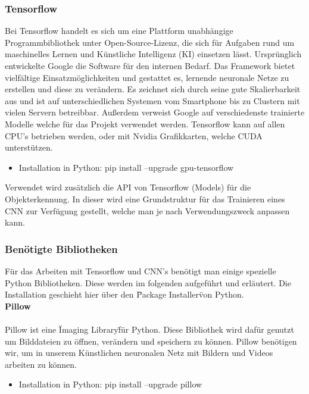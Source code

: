 \documentclass[a4paper,12pt,oneside]{article}
\begin{document}
  \subsubsection{Tensorflow}
Bei Tensorflow handelt es sich um eine Plattform unabhängige Programmbibliothek unter Open-Source-Lizenz, die sich für Aufgaben rund um maschinelles Lernen und Künstliche Intelligenz (KI) einsetzen lässt. Ursprünglich entwickelte Google die Software für den internen Bedarf. Das Framework bietet vielfältige Einsatzmöglichkeiten und gestattet es, lernende neuronale Netze zu erstellen und diese zu verändern. Es zeichnet sich durch seine gute Skalierbarkeit aus und ist auf unterschiedlichen Systemen vom Smartphone bis zu Clustern mit vielen Servern betreibbar. Außerdem verweist Google auf verschiedenste trainierte Modelle welche für das Projekt verwendet werden. Tensorflow kann auf allen CPU's betrieben werden, oder mit Nvidia Grafikkarten, welche CUDA unterstützen.

  \begin{itemize}
\item Installation in Python: pip install --upgrade gpu-tensorflow
  \end{itemize}
  
Verwendet wird zusätzlich die API von Tensorflow (Models) für die Objekterkennung. In dieser wird eine Grundstruktur für das Trainieren eines CNN zur Verfügung gestellt, welche man je nach Verwendungszweck anpassen kann.
  
  \subsubsection{Benötigte Bibliotheken}
Für das Arbeiten mit Tensorflow und CNN's benötigt man einige spezielle Python Bibliotheken. Diese werden im folgenden aufgeführt und erläutert. Die Installation geschieht hier über den \"Package Installer\" von Python.
\\
 
\textbf{Pillow}\\\\
Pillow ist eine \"Imaging Library\" für Python. Diese Bibliothek wird dafür genutzt um Bilddateien zu öffnen, verändern und speichern zu können. Pillow benötigen wir, um in unserem Künstlichen neuronalen Netz mit Bildern und Videos arbeiten zu können.

  \begin{itemize}
\item Installation in Python: pip install --upgrade pillow
  \end{itemize}
\end{document}
